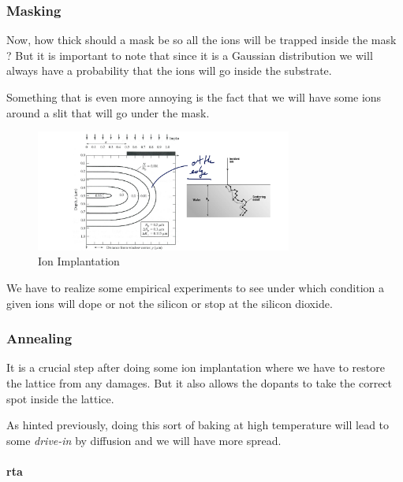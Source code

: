 \documentclass[
]{article}
\begin{document}
\hypertarget{masking}{%
\subsubsection{Masking}\label{masking}}

Now, how thick should a mask be so all the ions will be trapped inside
the mask ? But it is important to note that since it is a Gaussian
distribution we will always have a probability that the ions will go
inside the substrate.

Something that is even more annoying is the fact that we will have some
ions around a slit that will go under the mask.

\begin{figure}
\hypertarget{fig:implantation-label}{%
\centering
\includegraphics[width=0.75\textwidth,height=\textheight]{implanatation.png}
\caption{Ion Implantation}\label{fig:implantation-label}
}
\end{figure}

We have to realize some empirical experiments to see under which
condition a given ions will dope or not the silicon or stop at the
silicon dioxide.

\hypertarget{annealing}{%
\subsubsection{Annealing}\label{annealing}}

It is a crucial step after doing some ion implantation where we have to
restore the lattice from any damages. But it also allows the dopants to
take the correct spot inside the lattice.

As hinted previously, doing this sort of baking at high temperature will
lead to some \emph{drive-in} by diffusion and we will have more spread.

\hypertarget{rta}{%
\paragraph{\texorpdfstring{{rta}}{rta}}\label{rta}}
\end{document}
